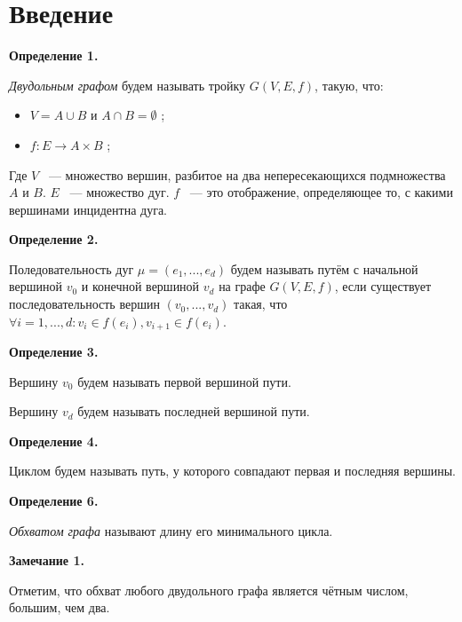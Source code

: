 \documentclass[14pt]{mmcs-article}
\begin{document}
\section*{Введение}

\textbf{Определение 1.}


\textsl{Двудольным графом} будем называть тройку $ G(V, E, f)$, такую, что:

\begin{itemize}
    \item $V = A \cup B$ и $A \cap B = \emptyset$ ;
    \item $f: E \rightarrow A \times B$ ;
\end{itemize}

Где $V$ ~--- множество вершин, разбитое на два непересекающихся подмножества $A$ и $B$.
$E$ ~--- множество дуг.
$f$ ~--- это отображение, определяющее то, с какими вершинами инцидентна дуга.

\textbf{Определение 2.}




Поледовательность дуг $\mu = (e_1, ..., e_d)$ будем называть путём с начальной вершиной $v_0$ и конечной вершиной $v_d$  на графе $G(V,E,f)$, если существует последовательность вершин $(v_0, ..., v_d)$ такая, что $\forall i = 1,...,d: v_i \in f(e_i), v_{i+1} \in f(e_i)$.

\textbf{Определение 3.}

Вершину $v_0$ будем называть первой вершиной пути.

Вершину $v_d$ будем называть последней вершиной пути.

\textbf{Определение 4.}

Циклом будем называть путь, у которого совпадают первая и последняя вершины.

\textbf{Определение 6.}

\textsl{Обхватом графа} называют длину его минимального цикла.

\textbf{Замечание 1.}

Отметим, что обхват любого двудольного графа является чётным числом, большим, чем два.
\end{document}
